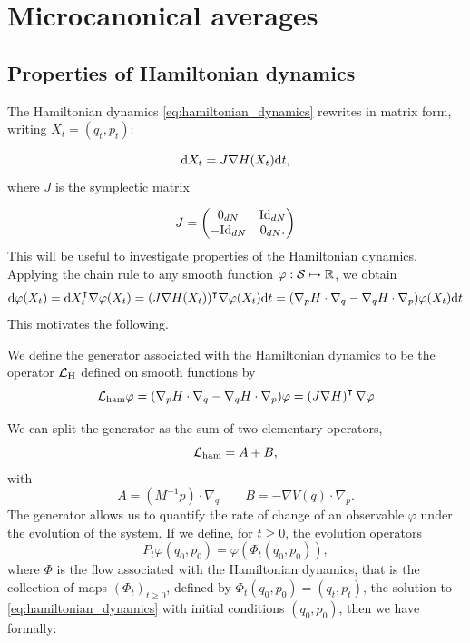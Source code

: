 \section{Microcanonical averages}
\subsection{Properties of Hamiltonian dynamics}


The Hamiltonian dynamics \eqref{eq:hamiltonian_dynamics} rewrites in matrix form, writing $X_t=(q_t,p_t)$:

\begin{equation}\label{eq:hamiltonian_dynamics_matrix_form} \text d X_t=J\nabla H(X_t)\mathrm{d}t,\end{equation}
where $J$ is the symplectic matrix

$$J = \begin{pmatrix}
    0_{dN} & \mathrm{Id}_{dN}\\ -\mathrm{Id}_{dN} & 0_{dN}.
\end{pmatrix}$$
This will be useful to investigate properties of the Hamiltonian dynamics.
Applying the chain rule to any smooth function $\varphi: \mathcal{S} \mapsto \mathbb{R}$, we obtain
        $$ \text d \varphi(X_t)= \text d X_t^{\intercal} \nabla \varphi(X_t)=(J \nabla H(X_t))^\intercal \nabla \varphi(X_t)\mathrm{d}t=(\nabla_p H \cdot \nabla_q - \nabla_q H \cdot \nabla_p)\varphi(X_t)\mathrm{d}t$$
        This motivates the following.
        \begin{definition}
            We define the generator associated with the Hamiltonian dynamics to be the operator $\mathcal{L}_{\text{H}}$ defined on smooth functions by
        \begin{equation}
            \label{eq:hamiltonian_generator}
            \mathcal{L}_{\mathrm{ham}}\varphi=(\nabla_p H \cdot \nabla_q - \nabla_q H \cdot \nabla_p)\varphi=\left(J\nabla H\right)^\intercal \nabla \varphi
        \end{equation}
    \end{definition}
    We can split the generator as the sum of two elementary operators,
    $$\mathcal{L}_{\rm ham}=A+B,$$
    with
    \begin{equation}
        \label{eq:Lham_splitting}
        A=\left(M^{-1}p\right)\cdot \nabla_q \qquad B=-\nabla V(q)\cdot \nabla_p.
    \end{equation}
    The generator allows us to quantify the rate of change of an observable $\varphi$ under the evolution of the system. If we define, for $t\geq 0$, the evolution operators 
    $$P_t \varphi (q_0,p_0) = \varphi(\Phi_t(q_0,p_0)),$$
where $\Phi$ is the flow associated with the Hamiltonian dynamics, that is the collection of maps $(\Phi_t)_{t\geq 0}$, defined by
    $\Phi_t (q_0,p_0) = (q_t,p_t)$, the solution to \eqref{eq:hamiltonian_dynamics} with initial conditions  $(q_0,p_0)$, then we have formally:


